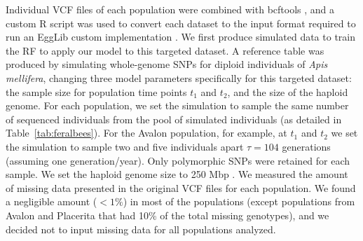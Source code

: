 \documentclass[a4paper, 12pt]{article}
\begin{document}
Individual VCF files of each population were combined with bcftools \citep{Li:2011kr}, and a custom R script was used to convert each dataset to the input format required to run an EggLib custom implementation \citep[in][]{Pavinato:2021}. We first produce simulated data to train the RF to apply our model to this targeted dataset. A reference table was produced by simulating whole-genome SNPs for diploid individuals of \textit{Apis mellifera}, changing three model parameters specifically for this targeted dataset: the sample size for population time points $t_1$ and $t_2$, and the size of the haploid genome. For each population, we set the simulation to sample the same number of sequenced individuals from the pool of simulated individuals (as detailed in Table~\ref{tab:feralbees}). For the Avalon population, for example, at $t_1$ and $t_2$ we set the simulation to sample two and five individuals apart $\tau = 104$ generations (assuming one generation/year). Only polymorphic SNPs were retained for each sample. We set the haploid genome size to 250 Mbp \citep[similar to the most recent estimates of \textit{A. mellifera} genome size;][]{Elsik:2014hf}. We measured the amount of missing data presented in the original VCF files \citep{Cridland:2018fx} for each population. We found a negligible amount ($< 1\%$) in most of the populations (except populations from Avalon and Placerita that had 10\% of the total missing genotypes), and we decided not to input missing data for all populations analyzed.
\end{document}
